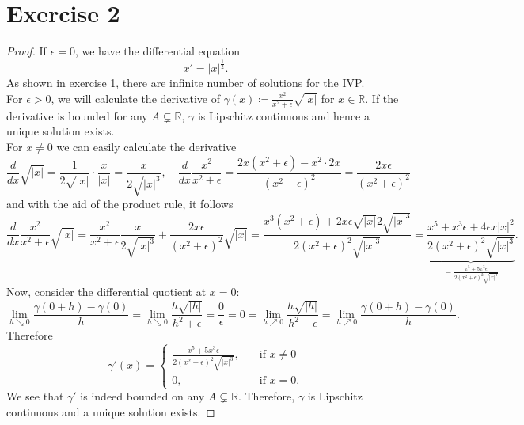 \documentclass{article}
\theoremstyle{named}
\begin{document}
	\section*{Exercise 2}
	\begin{proof}
		If $\epsilon = 0$, we have the differential equation
		\[
		x' = |x|^{\frac{1}{2}}.
		\]
		As shown in exercise 1, there are infinite number of solutions for the IVP.
		\\
		
		For $\epsilon  > 0$, we will calculate the derivative of $\gamma(x) \coloneqq \frac{x^2}{x^2+\epsilon}\sqrt{|x|}$ for $x \in \mathbb R$. If the derivative is bounded for any $A \subsetneq \mathbb R$, $\gamma$ is Lipschitz continuous and hence a unique solution exists.
		\\
		
		For $x \neq 0$ we can easily calculate the derivative
		\[
		\frac{d}{dx}\sqrt{|x|} = \frac{1}{2\sqrt{|x|}}\cdot \frac{x}{|x|} = \frac{x}{2\sqrt{|x|^3}}, \quad \frac{d}{dx}\frac{x^2}{x^2+\epsilon} = \frac{2x(x^2+\epsilon)-x^2\cdot 2x}{(x^2+\epsilon)^2} = \frac{2x\epsilon}{(x^2+\epsilon)^2}
		\]
		and with the aid of the product rule, it follows
		\[
		\frac{d}{dx} \frac{x^2}{x^2+\epsilon}\sqrt{|x|} = \frac{x^2}{x^2+\epsilon}\frac{x}{2\sqrt{|x|^3}} + \frac{2x\epsilon}{(x^2+\epsilon)^2} \sqrt{|x|} = \frac{x^3(x^2+\epsilon) + 2x\epsilon\sqrt{|x|}2\sqrt{|x|^3}}{2(x^2+\epsilon)^2\sqrt{|x|^3}} = \underbrace{\frac{x^5 + x^3\epsilon + 4\epsilon x|x|^2}{2(x^2+\epsilon)^2\sqrt{|x|^3}}}_{=\frac{x^5 + 5x^3\epsilon}{2(x^2+\epsilon)^2\sqrt{|x|^3}}}.
		\]
		Now, consider the differential quotient at $x=0$:
		\[
		\lim_{h \searrow 0} \frac{\gamma(0+h)-\gamma(0)}{h} = \lim_{h \searrow 0} \frac{h\sqrt{|h|}}{h^2+\epsilon} = \frac{0}{\epsilon} = 0 = \lim_{h \nearrow 0} \frac{h\sqrt{|h|}}{h^2+\epsilon}  = \lim_{h \nearrow 0}\frac{\gamma(0+h)-\gamma(0)}{h}.
		\]
		Therefore
		\[
		\gamma'(x) = \begin{cases}
		\frac{x^5 + 5x^3\epsilon}{2(x^2+\epsilon)^2\sqrt{|x|^3}}, \quad & \text{if } x \neq 0 \\
		0, \quad &\text{if } x =0.
		\end{cases}
		\]
		We see that $\gamma'$ is indeed bounded on any $A \subsetneq \mathbb R$. Therefore, $\gamma$ is Lipschitz continuous and a unique solution exists.
	\end{proof}
	
\end{document}
